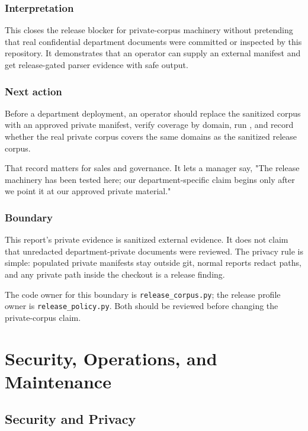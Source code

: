 \documentclass[12pt,a4paper,openany]{book}
\begin{document}
\section*{Interpretation}

This closes the release blocker for private-corpus machinery without pretending
that real confidential department documents were committed or inspected by this
repository. It demonstrates that an operator can supply an external manifest and
get release-gated parser evidence with safe output.

\section*{Next action}

Before a department deployment, an operator should replace the sanitized corpus
with an approved private manifest, verify coverage by domain, run
, and record whether the real
private corpus covers the same domains as the sanitized release corpus.

That record matters for sales and governance. It lets a manager say, "The
release machinery has been tested here; our department-specific claim begins
only after we point it at our approved private material."

\section*{Boundary}

This report's private evidence is sanitized external evidence. It does not claim
that unredacted department-private documents were reviewed. The privacy rule is
simple: populated private manifests stay outside git, normal reports redact
paths, and any private path inside the checkout is a release finding.

The code owner for this boundary is \texttt{release\_corpus.py}; the release
profile owner is \texttt{release\_policy.py}. Both should be reviewed before
changing the private-corpus claim.

\part{Security, Operations, and Maintenance}

\chapter{Security and Privacy}
\end{document}
